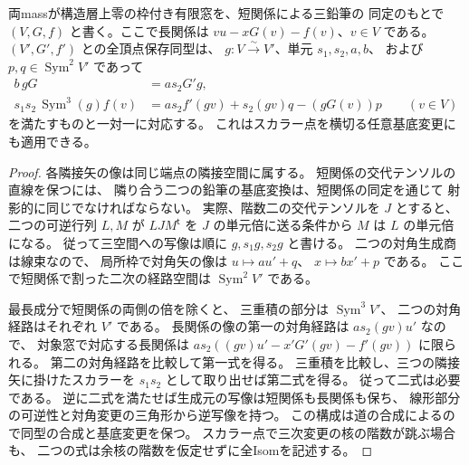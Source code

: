 \begin{proposition}[両mass零の有限窓の全頂点保存同型]
\label{prop:qa-avatar-deep-all-isoms}
両massが構造層上零の枠付き有限窓を、短関係による三鉛筆の
同定のもとで $(V,G,f)$ と書く。ここで長関係は
$v u-x G(v)-f(v)$、$v\in V$ である。
$(V',G',f')$ との全頂点保存同型は、
$g:V\xrightarrow{\sim}V'$、単元 $s_1,s_2,a,b$、
および $p,q\in\operatorname{Sym}^2V'$ であって
\[
 \begin{aligned}
  b\,gG&=a s_2 G'g,\\
  s_1s_2\,\operatorname{Sym}^3(g) f(v)
    &=a s_2 f'(gv)+s_2(gv)q-(gG(v))p
       \qquad(v\in V)
 \end{aligned}
\]
を満たすものと一対一に対応する。
これはスカラー点を横切る任意基底変更にも適用できる。
\end{proposition}
\begin{proof}
各隣接矢の像は同じ端点の隣接空間に属する。
短関係の交代テンソルの直線を保つには、
隣り合う二つの鉛筆の基底変換は、短関係の同定を通じて
射影的に同じでなければならない。
実際、階数二の交代テンソルを $J$ とすると、
二つの可逆行列 $L,M$ が $LJM^{\mathsf t}$ を
$J$ の単元倍に送る条件から $M$ は $L$ の単元倍になる。
従って三空間への写像は順に $g,s_1g,s_2g$ と書ける。
二つの対角生成商は線束なので、
局所枠で対角矢の像は $u\mapsto a u'+q$、
$x\mapsto b x'+p$ である。
ここで短関係で割った二次の経路空間は
$\operatorname{Sym}^2V'$ である。

最長成分で短関係の両側の倍を除くと、
三重積の部分は $\operatorname{Sym}^3V'$、
二つの対角経路はそれぞれ $V'$ である。
長関係の像の第一の対角経路は $a s_2(gv)u'$ なので、
対象窓で対応する長関係は
$a s_2((gv)u'-x'G'(gv)-f'(gv))$ に限られる。
第二の対角経路を比較して第一式を得る。
三重積を比較し、三つの隣接矢に掛けたスカラーを
$s_1s_2$ として取り出せば第二式を得る。
従って二式は必要である。
逆に二式を満たせば生成元の写像は短関係も長関係も保ち、
線形部分の可逆性と対角変更の三角形から逆写像を持つ。
この構成は道の合成によるので同型の合成と基底変更を保つ。
スカラー点で三次変更の核の階数が跳ぶ場合も、
二つの式は余核の階数を仮定せずに全Isomを記述する。
\end{proof}


